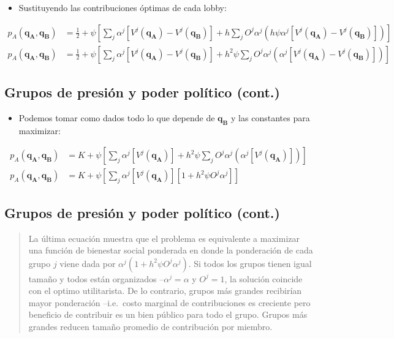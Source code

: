\documentclass[
  letterpaper,
  DIV=11,
  numbers=noendperiod]{scrartcl}
\providecommand{\tightlist}{%
  \setlength{\itemsep}{0pt}\setlength{\parskip}{0pt}}\usepackage{longtable,booktabs,array}
\begin{document}
\begin{itemize}
\tightlist
\item
  Sustituyendo las contribuciones óptimas de cada lobby:
\end{itemize}

\begin{align}
p_{A}(\mathbf{q_{A}},\mathbf{q_{B}})&=\frac{1}{2}+\psi
    \left[\sum_{j}\alpha^{j}[V^{j}(\mathbf{q_{A}})-V^{j}(\mathbf{q_{B}})]+h\sum_{j}O^{j}\alpha^{j}(h\psi\alpha^{j}[V^{j}(\mathbf{q_{A}})-V^{j}(\mathbf{q_{B}})])\right]
    \\
p_{A}(\mathbf{q_{A}},\mathbf{q_{B}})&=\frac{1}{2}+\psi
    \left[\sum_{j}\alpha^{j}[V^{j}(\mathbf{q_{A}})-V^{j}(\mathbf{q_{B}})]+h^{2}\psi\sum_{j}O^{j}\alpha^{j}(\alpha^{j}[V^{j}(\mathbf{q_{A}})-V^{j}(\mathbf{q_{B}})])\right]
\end{align}

\subsection{Grupos de presión y poder político
(cont.)}\label{grupos-de-presiuxf3n-y-poder-poluxedtico-cont.-9}

\begin{itemize}
\tightlist
\item
  Podemos tomar como dados todo lo que depende de \(\mathbf{q_{B}}\) y
  las constantes para maximizar:
\end{itemize}

\begin{align}
p_{A}(\mathbf{q_{A}},\mathbf{q_{B}})&=K+\psi
    \left[\sum_{j}\alpha^{j}[V^{j}(\mathbf{q_{A}})]+h^{2}\psi\sum_{j}O^{j}\alpha^{j}(\alpha^{j}[V^{j}(\mathbf{q_{A}})])\right] \\
p_{A}(\mathbf{q_{A}},\mathbf{q_{B}})&=K+\psi
    \left[\sum_{j}\alpha^{j}[V^{j}(\mathbf{q_{A}})][1+h^{2}\psi
    O^{j}\alpha^{j}]\right]
\end{align}

\subsection{Grupos de presión y poder político
(cont.)}\label{grupos-de-presiuxf3n-y-poder-poluxedtico-cont.-10}

\begin{quote}
La última ecuación muestra que el problema es equivalente a maximizar
una función de bienestar social ponderada en donde la ponderación de
cada grupo \(j\) viene dada por \(\alpha^{j}(1+h^{2}\psi
O^{j}\alpha^{j})\). Si todos los grupos tienen igual tamaño y todos
están organizados --\(\alpha^{j}=\alpha\) y \(O^{j}=1\), la solución
coincide con el optimo utilitarista. De lo contrario, grupos más grandes
recibirían mayor ponderación --i.e.~costo marginal de contribuciones es
creciente pero beneficio de contribuir es un bien público para todo el
grupo. Grupos más grandes reducen tamaño promedio de contribución por
miembro.
\end{quote}
\end{document}
